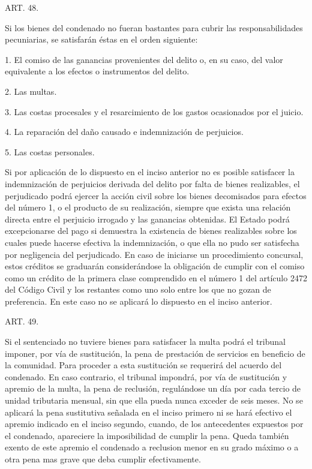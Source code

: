     ART. 48.

    Si los bienes del condenado no fueran bastantes para cubrir las responsabilidades pecuniarias, se satisfarán éstas en el orden siguiente:

    1. El comiso de las ganancias provenientes del delito o, en su caso, del valor equivalente a los efectos o instrumentos del delito.

    2. Las multas.

    3. Las costas procesales y el resarcimiento de los gastos ocasionados por el juicio.

    4. La reparación del daño causado e indemnización de perjuicios.

    5. Las costas personales.

    Si por aplicación de lo dispuesto en el inciso anterior no es posible satisfacer la indemnización de perjuicios derivada del delito por falta de bienes realizables, el perjudicado podrá ejercer la acción civil sobre los bienes decomisados para efectos del número 1, o el producto de su realización, siempre que exista una relación directa entre el perjuicio irrogado y las ganancias obtenidas. El Estado podrá excepcionarse del pago si demuestra la existencia de bienes realizables sobre los cuales puede hacerse efectiva la indemnización, o que ella no pudo ser satisfecha por negligencia del perjudicado.
    En caso de iniciarse un procedimiento concursal, estos créditos se graduarán considerándose la obligación de cumplir con el comiso como un crédito de la primera clase comprendido en el número 1 del artículo 2472 del Código Civil y los restantes como uno solo entre los que no gozan de preferencia. En este caso no se aplicará lo dispuesto en el inciso anterior.


    ART. 49.

    Si el sentenciado no tuviere bienes para satisfacer la multa podrá el tribunal imponer, por vía de sustitución, la pena de prestación de servicios en beneficio de la comunidad.
    Para proceder a esta sustitución se requerirá del acuerdo del condenado. En caso contrario, el tribunal impondrá, por vía de sustitución y apremio de la multa, la pena de reclusión, regulándose un día por cada tercio de unidad tributaria mensual, sin que ella pueda nunca exceder de seis meses.
    No se aplicará la pena sustitutiva señalada en el inciso primero ni se hará efectivo el apremio indicado en el inciso segundo, cuando, de los antecedentes expuestos por el condenado, apareciere la imposibilidad de cumplir la pena.
    Queda también exento de este apremio el condenado a reclusion menor en su grado máximo o a otra pena mas grave que deba cumplir efectivamente.



